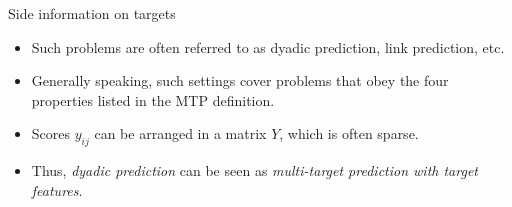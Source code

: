 \documentclass[11pt,compress,t,notes=noshow, xcolor=table]{beamer}
\begin{document}
\begin{vbframe}{Side information on targets}
\begin{itemize}
        \footnotesize
        
        \item Such problems are often referred to as dyadic prediction, link prediction, etc.
        
        \item Generally speaking, such settings cover problems that obey the four properties listed in the MTP definition.
        
        \item Scores $y_{ij}$ can be arranged in a matrix $Y$, which is often sparse. 
        
        \item Thus, \emph{dyadic prediction} can be seen as \emph{multi-target prediction with target features}. 
    \end{itemize}
\end{vbframe}
\end{document}
